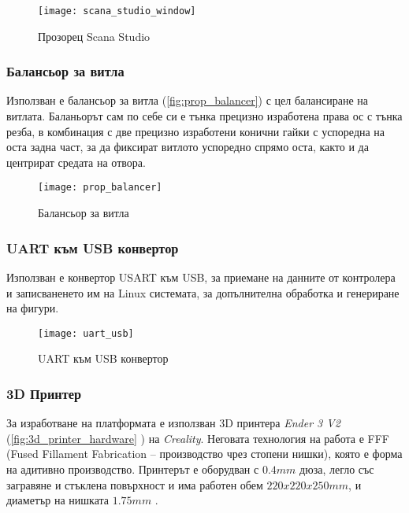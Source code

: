 \begin{figure}[htpb!]
    \centering
    \texttt{[image: scana\_studio\_window]}
    \caption{Прозорец Scana Studio}
    \label{fig:scana_studio_window}
\end{figure}

\FloatBarrier


\subsubsection{Балансьор за витла}
\FloatBarrier


Използван е балансьор за витла (\autoref{fig:prop_balancer}) с цел балансиране на витлата.
Баланьорът сам по себе си е тънка прецизно изработена права ос с тънка резба, в комбинация с две прецизно изработени конични гайки с успоредна на оста задна част,
за да фиксират витлото успоредно спрямо оста, както и да центрират средата на отвора.
 
\begin{figure}[htpb!]
    \centering
    \texttt{[image: prop\_balancer]}
    \caption{Балансьор за витла}
    \label{fig:prop_balancer}
\end{figure}




\subsubsection{UART към USB конвертор}
\FloatBarrier


Използван е конвертор USART към USB, за приемане на данните от контролера и записваненето им
на Linux системата, за допълнителна обработка и генериране на фигури.

\begin{figure}[htpb!]
    \centering
    \texttt{[image: uart\_usb]}
    \caption{UART към USB конвертор}
    \label{fig:prop_balancer2}
\end{figure}


\subsubsection{3D Принтер}
\FloatBarrier

За изработване на платформата е използван 3D принтера \textit{Ender 3 V2} (\autoref{fig:3d_printer_hardware} ) на \textit{Creality}.
Неговата технология на работа е FFF (Fused Fillament Fabrication -- производство чрез стопени нишки), която е форма на адитивно производство.
Принтерът е оборудван с \(0.4mm\) дюза,
легло със загравяне и стъклена повърхност
и има работен обем \(220x220x250mm\), 
и диаметър на нишката \(1.75mm\) \cite{user_manual_3d_printer}.

